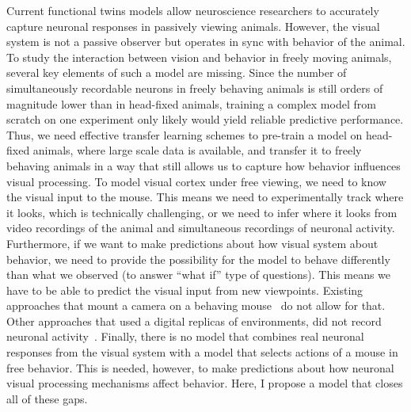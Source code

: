 \documentclass[B2,COG]{ercgrant}
\begin{document}
Current functional twins models allow neuroscience researchers to accurately capture neuronal responses in passively viewing animals. 
However, the visual system is not a passive observer but operates in sync with behavior of the animal. 
To study the interaction between vision and behavior in freely moving animals, several key elements of such a model are missing. 
Since the number of simultaneously recordable neurons in freely behaving animals is still orders of magnitude lower than in head-fixed animals, training a complex model from scratch on one experiment only likely would yield reliable predictive performance. 
Thus, we need effective transfer learning schemes to pre-train a model on head-fixed animals, where large scale data is available, and transfer it to freely behaving animals in a way that still allows us to capture how behavior influences visual processing. 
To model visual cortex under free viewing, we need to know the visual input to the mouse. 
This means we need to experimentally track where it looks, which is technically challenging, or we need to infer where it looks from video recordings of the animal and simultaneous recordings of neuronal activity. 
Furthermore, if we want to make predictions about how visual system about behavior, we need to provide the possibility for the model to behave differently than what we observed (to answer ``what if'' type of questions). 
This means we have to be able to predict the visual input from new viewpoints.
Existing approaches that mount a camera on a behaving mouse~\parencite{Parker2022-ac} do not allow for that. 
Other approaches that used a digital replicas of environments, did not record neuronal activity~\parencite{Holmgren2021-jv}.
Finally, there is no model that combines real neuronal responses from the visual system with a model that selects actions of a mouse in free behavior. 
This is needed, however, to make predictions about how neuronal visual processing mechanisms affect behavior. 
Here, I propose a model that closes all of these gaps. 
\end{document}
